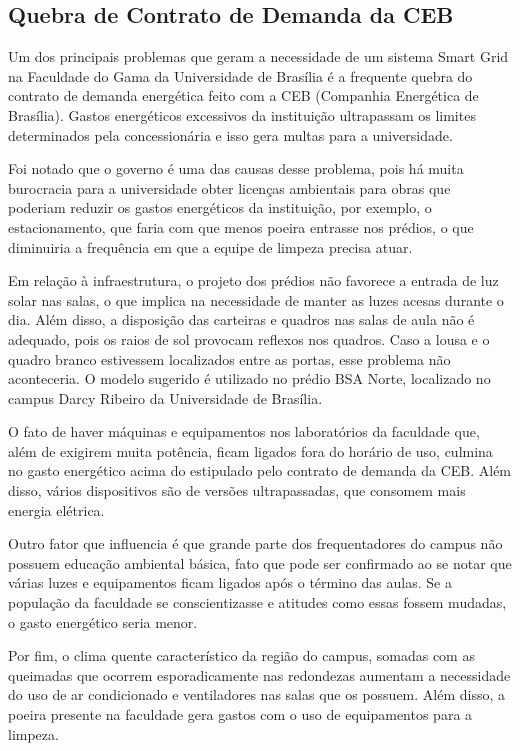 \subsection{Quebra de Contrato de Demanda da CEB}
Um dos principais problemas que geram a necessidade de um sistema Smart Grid na Faculdade do Gama da Universidade de Brasília é a frequente quebra do contrato de demanda energética feito com a CEB (Companhia Energética de Brasília). Gastos energéticos excessivos da instituição ultrapassam os limites determinados pela concessionária e isso gera multas para a universidade. 
\par Foi notado que o governo é uma das causas desse problema, pois há muita burocracia para a universidade obter licenças ambientais para obras que poderiam reduzir os gastos energéticos da instituição, por exemplo, o estacionamento, que faria com que menos poeira entrasse nos prédios, o que diminuiria a frequência em que a equipe de limpeza precisa atuar.
\par Em relação à infraestrutura, o projeto dos prédios não favorece a entrada de luz solar nas salas, o que implica na necessidade de manter as luzes acesas durante o dia. Além disso, a disposição das carteiras e quadros nas salas de aula não é adequado, pois os raios de sol provocam reflexos nos quadros. Caso a lousa e o quadro branco estivessem localizados entre as portas, esse problema não aconteceria. O modelo sugerido é utilizado no prédio BSA Norte, localizado no campus Darcy Ribeiro da Universidade de Brasília. 
\par O fato de haver máquinas e equipamentos nos laboratórios da faculdade que, além de exigirem muita potência, ficam ligados fora do horário de uso, culmina no gasto energético acima do estipulado pelo contrato de demanda da CEB. Além disso, vários dispositivos são de versões ultrapassadas, que consomem mais energia elétrica.  
\par Outro fator que influencia é que grande parte dos frequentadores do campus não possuem educação ambiental básica, fato que pode ser confirmado ao se notar que várias luzes e equipamentos ficam ligados após o término das aulas. Se a população da faculdade se conscientizasse e atitudes como essas fossem mudadas, o gasto energético seria menor. 
\par Por fim, o clima quente característico da região do campus, somadas com as queimadas que ocorrem esporadicamente nas redondezas aumentam a necessidade do uso de ar condicionado e ventiladores nas salas que os possuem. Além disso, a poeira presente na faculdade gera gastos com o uso de equipamentos para a limpeza.

